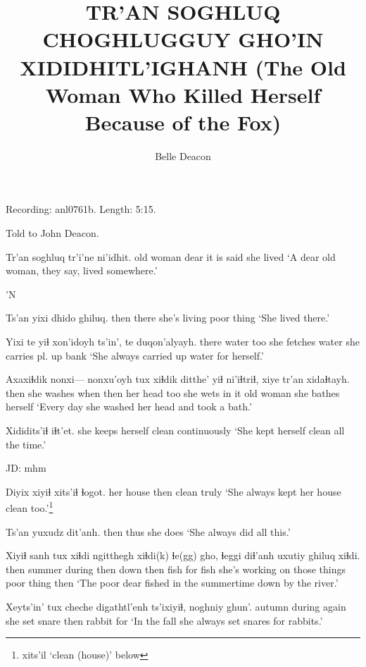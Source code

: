\documentclass[12pt]{article}
\begin{document}
\title{TR'AN SOGHLUQ CHOGHLUGGUY GHO'IN XIDIDHITL'IGHANH \newline(The Old Woman Who Killed Herself Because of the Fox)}

\author{Belle Deacon}

\maketitle

Recording:  anl0761b. Length:  5:15.

Told to John Deacon.

\bigskip

\gll Tr'an soghluq tr'i'ne ni'idhit. 
{old woman} dear {it is said} {she lived}
\glt `A dear old woman, they say, lived somewhere.'
\glend

'N

\gll Ts'an yixi dhido ghiluq. 
then there {she's living} {poor thing}
\glt `She lived there.' 
\glend

\gll Yixi te yiɬ xon'idoyh ts'in', te duqon'alyayh. 
there water too {she fetches} {} water {she carries pl. up bank}
\glt `She always carried up water for herself.'
\glend

\gll Axaxiɬdik nonxi--- nonxu'oyh tux xiɬdik ditthe' yiɬ ni'iɬtriɬ, xiye tr'an xidaɬtayh.  
then {} {she washes} when then {her head} too {she wets} {in it} {old woman} {she bathes herself}
\glt `Every day she washed her head and took a bath.'
\glend

\gll Xididits'iɬ iɬt'et. 
{she keeps herself clean} continuously
\glt `She kept herself clean all the time.' 
\glend

JD:  mhm

\gll Diyix xiyiɬ xits'iɬ ɬogot. 
{her house} then clean truly
\glt `She always kept her house clean too.'\footnote{xits'il `clean (house)' below}
\glend

\gll Ts'an yuxudz dit'anh.
then thus {she does}
\glt `She always did all this.' 
\glend

\gll Xiyiɬ sanh tux xiɬdi ngitthegh xiɬdi(k) ɬe(gg) gho, ɬeggi diɬ'anh uxutiy ghiluq xiɬdi.
then summer during then down then fish for fish {she's working on} {those things} {poor thing} then
\glt `The poor dear fished in the summertime down by the river.'
\glend

\gll Xeyts'in' tux cheche digathtl'enh ts'ixiyiɬ, noghniy ghun'.
autumn during again {she set snare} then rabbit for
\glt `In the fall she always set snares for rabbits.'
\glend
\end{document}
